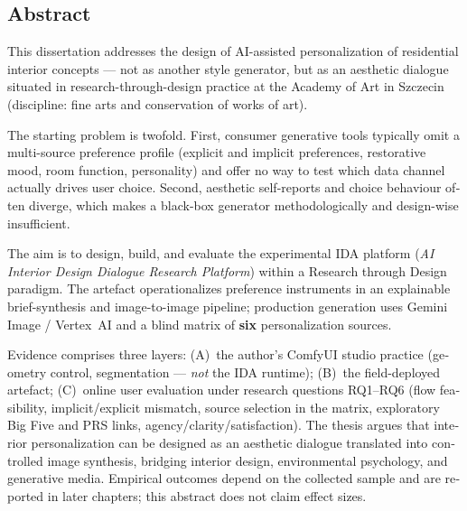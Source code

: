 \vspace{1.5em}
\begin{otherlanguage}{english}
\chapter*{Abstract}

This dissertation addresses the design of AI-assisted personalization of residential interior concepts --- not as another style generator, but as an aesthetic dialogue situated in research-through-design practice at the Academy of Art in Szczecin (discipline: fine arts and conservation of works of art).

The starting problem is twofold. First, consumer generative tools typically omit a multi-source preference profile (explicit and implicit preferences, restorative mood, room function, personality) and offer no way to test which data channel actually drives user choice. Second, aesthetic self-reports and choice behaviour often diverge, which makes a black-box generator methodologically and design-wise insufficient.

The aim is to design, build, and evaluate the experimental IDA platform (\emph{AI Interior Design Dialogue Research Platform}) within a Research through Design paradigm. The artefact operationalizes preference instruments in an explainable brief-synthesis and image-to-image pipeline; production generation uses Gemini Image / Vertex~AI and a blind matrix of \textbf{six} personalization sources.

Evidence comprises three layers: (A)~the author's ComfyUI studio practice (geometry control, segmentation --- \emph{not} the IDA runtime); (B)~the field-deployed artefact; (C)~online user evaluation under research questions RQ1--RQ6 (flow feasibility, implicit/explicit mismatch, source selection in the matrix, exploratory Big Five and PRS links, agency/clarity/satisfaction). The thesis argues that interior personalization can be designed as an aesthetic dialogue translated into controlled image synthesis, bridging interior design, environmental psychology, and generative media. Empirical outcomes depend on the collected sample and are reported in later chapters; this abstract does not claim effect sizes.
\end{otherlanguage}
